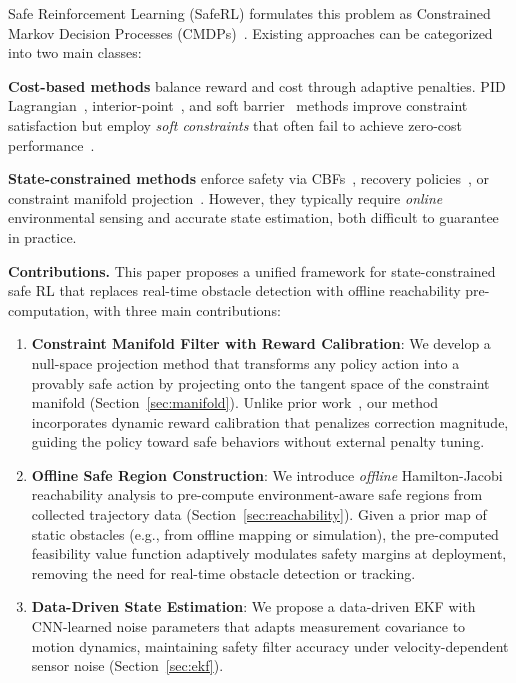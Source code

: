 \documentclass[letterpaper, 10 pt, conference]{ieeeconf}
\begin{document}
Safe Reinforcement Learning (SafeRL) formulates this problem as Constrained Markov Decision Processes (CMDPs)~\cite{altman1999cmdp}. Existing approaches can be categorized into two main classes:

\textbf{Cost-based methods} balance reward and cost through adaptive penalties. PID Lagrangian~\cite{stooke2020responsive}, interior-point~\cite{liu2022ipo}, and soft barrier~\cite{wang2023soft_barrier} methods improve constraint satisfaction but employ \emph{soft constraints} that often fail to achieve zero-cost performance~\cite{liu2024safe_survey}.

\textbf{State-constrained methods} enforce safety via CBFs~\cite{dawson2023safe_cbf, as2022cbfrl}, recovery policies~\cite{thananjeyan2021recovery}, or constraint manifold projection~\cite{liu2022atacom, liu2023safe_manipulation}. However, they typically require \emph{online} environmental sensing and accurate state estimation, both difficult to guarantee in practice.

\textbf{Contributions.} This paper proposes a unified framework for state-constrained safe RL that replaces real-time obstacle detection with offline reachability pre-computation, with three main contributions:

\begin{enumerate}
    \item \textbf{Constraint Manifold Filter with Reward Calibration}: We develop a null-space projection method that transforms any policy action into a provably safe action by projecting onto the tangent space of the constraint manifold (Section~\ref{sec:manifold}). Unlike prior work~\cite{liu2022atacom}, our method incorporates dynamic reward calibration that penalizes correction magnitude, guiding the policy toward safe behaviors without external penalty tuning.

    \item \textbf{Offline Safe Region Construction}: We introduce \emph{offline} Hamilton-Jacobi reachability analysis to pre-compute environment-aware safe regions from collected trajectory data (Section~\ref{sec:reachability}). Given a prior map of static obstacles (e.g., from offline mapping or simulation), the pre-computed feasibility value function adaptively modulates safety margins at deployment, removing the need for real-time obstacle detection or tracking.

    \item \textbf{Data-Driven State Estimation}: We propose a data-driven EKF with CNN-learned noise parameters that adapts measurement covariance to motion dynamics, maintaining safety filter accuracy under velocity-dependent sensor noise (Section~\ref{sec:ekf}).
\end{enumerate}
\end{document}
